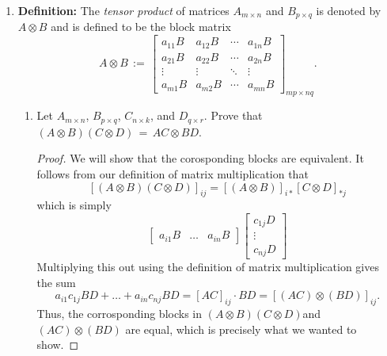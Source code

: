\documentclass[11pt,table]{article}
\newcommand {\mat}  [1] {\left[\begin{array}{#1}}
\newcommand {\rix}      {\end{array}\right]}
\newcommand{\<}				{\langle}
\renewcommand{\>}      		{\rangle}
\newcommand{\tensor}        {\otimes}
\begin{document}
\begin{enumerate}
\begin{proof}
	Considering the image as a block matrix we will have that $\texttt{vec}(\delta A + B)_{i \ast} = [\delta A + B]_{\ast i}$, where on the left side, $i$ denotes the $i^{th}$ block and on the right, $i$ denotes the $i^{th}$ column. Then a simple appliction of the definition of matrix addition and scalar multiplictation, we get 
	$[\delta A + B]_{\ast i} = \delta [A]_{\ast i} + [B]_{\ast i}= \delta \texttt{vec}(A)_{i \ast} + \texttt{vec}(B)_{i \ast}$. So, ${\tt vec}(\delta A + B) = \delta {\tt vec}(A) + {\tt vec}(B)$. 

\end{proof}

\smallskip
\item 
{\bf Definition:} 
The {\em tensor product} of matrices $A_{m \times n}$ and $B_{p \times q}$ is denoted 
by $A \otimes B$ and is defined to be the block matrix 
\begin{equation} \label{prob2-eqn-tensor-prod-def}
	A \otimes B \, := \, 
	\left[
		\begin{array}{cccc}
			a_{11}B & a_{12}B & \cdots & a_{1n}B \\ 
			a_{21}B & a_{22}B & \cdots & a_{2n} B \\
			\vdots & \vdots & \ddots & \vdots \\
			a_{m1} B & a_{m2} B & \cdots & a_{mn}B
		\end{array}
	\right]_{mp \times nq} .
\end{equation}

	
\begin{enumerate}
	\item Let $A_{m \times n}$, $B_{p \times q}$, $C_{n \times k}$, and $D_{q \times r}$. 
		Prove that $(A \otimes B)(C \otimes D) \, = \, AC \otimes BD$. 
		
		\begin{proof}
			We will show that the corosponding blocks are equivalent. It follows from our definition of matrix multiplication that 
			\[ [(A \tensor B)(C \tensor D)]_{ij} = [(A \tensor B)]_{i \ast} [C \tensor D]_{\ast j}\] 
			which is simply 
			\[ \mat{rrr} a_{i1}B & \dots & a_{in}B \rix \mat{c} c_{1j}D \\ \vdots \\ c_{nj}D \rix \]
			Multiplying this out using the definition of matrix multiplication gives the sum
			\[ a_{i1}c_{1j}BD + \dots + a_{in}c_{nj}BD = [AC]_{ij} \cdot BD = [(AC) \tensor (BD)]_{ij}.\]
			Thus, the corrosponding blocks in $(A \tensor B)(C \tensor D) $and $(AC) \tensor (BD)$ are equal, which is precisely what we wanted to show. 


\end{proof}
\end{enumerate}
\end{enumerate}
\end{document}
